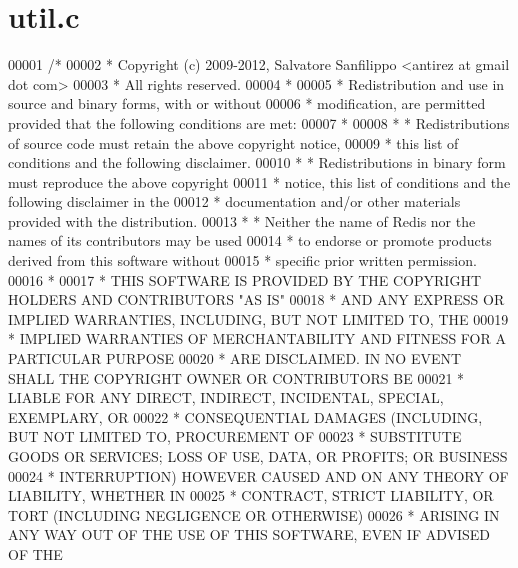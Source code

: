 \hypertarget{util_8c_source}{}\section{util.\+c}
\label{util_8c_source}

\begin{DoxyCode}
00001 \textcolor{comment}{/*}
00002 \textcolor{comment}{ * Copyright (c) 2009-2012, Salvatore Sanfilippo <antirez at gmail dot com>}
00003 \textcolor{comment}{ * All rights reserved.}
00004 \textcolor{comment}{ *}
00005 \textcolor{comment}{ * Redistribution and use in source and binary forms, with or without}
00006 \textcolor{comment}{ * modification, are permitted provided that the following conditions are met:}
00007 \textcolor{comment}{ *}
00008 \textcolor{comment}{ *   * Redistributions of source code must retain the above copyright notice,}
00009 \textcolor{comment}{ *     this list of conditions and the following disclaimer.}
00010 \textcolor{comment}{ *   * Redistributions in binary form must reproduce the above copyright}
00011 \textcolor{comment}{ *     notice, this list of conditions and the following disclaimer in the}
00012 \textcolor{comment}{ *     documentation and/or other materials provided with the distribution.}
00013 \textcolor{comment}{ *   * Neither the name of Redis nor the names of its contributors may be used}
00014 \textcolor{comment}{ *     to endorse or promote products derived from this software without}
00015 \textcolor{comment}{ *     specific prior written permission.}
00016 \textcolor{comment}{ *}
00017 \textcolor{comment}{ * THIS SOFTWARE IS PROVIDED BY THE COPYRIGHT HOLDERS AND CONTRIBUTORS "AS IS"}
00018 \textcolor{comment}{ * AND ANY EXPRESS OR IMPLIED WARRANTIES, INCLUDING, BUT NOT LIMITED TO, THE}
00019 \textcolor{comment}{ * IMPLIED WARRANTIES OF MERCHANTABILITY AND FITNESS FOR A PARTICULAR PURPOSE}
00020 \textcolor{comment}{ * ARE DISCLAIMED. IN NO EVENT SHALL THE COPYRIGHT OWNER OR CONTRIBUTORS BE}
00021 \textcolor{comment}{ * LIABLE FOR ANY DIRECT, INDIRECT, INCIDENTAL, SPECIAL, EXEMPLARY, OR}
00022 \textcolor{comment}{ * CONSEQUENTIAL DAMAGES (INCLUDING, BUT NOT LIMITED TO, PROCUREMENT OF}
00023 \textcolor{comment}{ * SUBSTITUTE GOODS OR SERVICES; LOSS OF USE, DATA, OR PROFITS; OR BUSINESS}
00024 \textcolor{comment}{ * INTERRUPTION) HOWEVER CAUSED AND ON ANY THEORY OF LIABILITY, WHETHER IN}
00025 \textcolor{comment}{ * CONTRACT, STRICT LIABILITY, OR TORT (INCLUDING NEGLIGENCE OR OTHERWISE)}
00026 \textcolor{comment}{ * ARISING IN ANY WAY OUT OF THE USE OF THIS SOFTWARE, EVEN IF ADVISED OF THE}

\end{DoxyCode}
